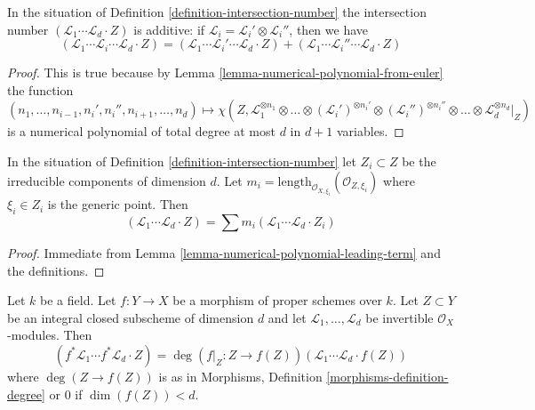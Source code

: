 \begin{lemma}
\label{lemma-intersection-number-additive}
In the situation of Definition \ref{definition-intersection-number}
the intersection number
$(\mathcal{L}_1 \cdots \mathcal{L}_d \cdot Z)$
is additive: if $\mathcal{L}_i = \mathcal{L}_i' \otimes \mathcal{L}_i''$,
then we have
$$
(\mathcal{L}_1 \cdots \mathcal{L}_i \cdots \mathcal{L}_d \cdot Z) =
(\mathcal{L}_1 \cdots \mathcal{L}_i' \cdots \mathcal{L}_d \cdot Z) +
(\mathcal{L}_1 \cdots \mathcal{L}_i'' \cdots \mathcal{L}_d \cdot Z)
$$
\end{lemma}

\begin{proof}
This is true because by Lemma \ref{lemma-numerical-polynomial-from-euler}
the function
$$
(n_1, \ldots, n_{i - 1}, n_i', n_i'', n_{i + 1}, \ldots, n_d)
\mapsto
\chi(Z, \mathcal{L}_1^{\otimes n_1} \otimes
\ldots \otimes (\mathcal{L}_i')^{\otimes n_i'} \otimes
(\mathcal{L}_i'')^{\otimes n_i''} \otimes \ldots \otimes
\mathcal{L}_d^{\otimes n_d}|_Z)
$$
is a numerical polynomial of total degree at most $d$ in $d + 1$ variables.
\end{proof}

\begin{lemma}
\label{lemma-intersection-number-in-terms-of-components}
In the situation of Definition \ref{definition-intersection-number}
let $Z_i \subset Z$ be the irreducible components of dimension $d$. Let
$m_i = \text{length}_{\mathcal{O}_{X, \xi_i}}(\mathcal{O}_{Z, \xi_i})$
where $\xi_i \in Z_i$ is the generic point. Then
$$
(\mathcal{L}_1 \cdots \mathcal{L}_d \cdot Z) =
\sum m_i(\mathcal{L}_1 \cdots \mathcal{L}_d \cdot Z_i)
$$
\end{lemma}

\begin{proof}
Immediate from Lemma \ref{lemma-numerical-polynomial-leading-term}
and the definitions.
\end{proof}

\begin{lemma}
\label{lemma-intersection-number-and-pullback}
Let $k$ be a field. Let $f : Y \to X$ be a morphism of proper schemes over $k$.
Let $Z \subset Y$ be an integral closed subscheme of dimension $d$ and let
$\mathcal{L}_1, \ldots, \mathcal{L}_d$ be invertible $\mathcal{O}_X$-modules.
Then
$$
(f^*\mathcal{L}_1 \cdots f^*\mathcal{L}_d \cdot Z) =
\deg(f|_Z : Z \to f(Z)) (\mathcal{L}_1 \cdots \mathcal{L}_d \cdot f(Z))
$$
where $\deg(Z \to f(Z))$ is as in
Morphisms, Definition \ref{morphisms-definition-degree}
or $0$ if $\dim(f(Z)) < d$.
\end{lemma}


